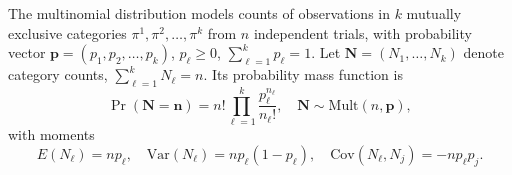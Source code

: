 



The multinomial distribution models counts of observations in $k$ mutually exclusive categories $\pi^1,\pi^2,\dots,\pi^k$ from $n$ independent trials, with probability vector $\mathbf{p} = (p_1, p_2, \dots, p_k)$, $p_\ell \ge 0$, $\sum_{\ell=1}^k p_\ell = 1$. Let $\mathbf{N} = (N_1, \dots, N_k)$ denote category counts, $\sum_{\ell=1}^k N_\ell = n$. Its probability mass function is
\[
\Pr(\mathbf{N} = \mathbf{n}) = n! \prod_{\ell=1}^k \frac{p_\ell^{n_\ell}}{n_\ell!}, \quad \mathbf{N} \sim \mathrm{Mult}(n, \mathbf{p}),
\]
with moments
\[
E(N_\ell) = n p_\ell, \quad
\mathrm{Var}(N_\ell) = n p_\ell (1-p_\ell), \quad
\mathrm{Cov}(N_\ell, N_j) = -n p_\ell p_j.
\]

